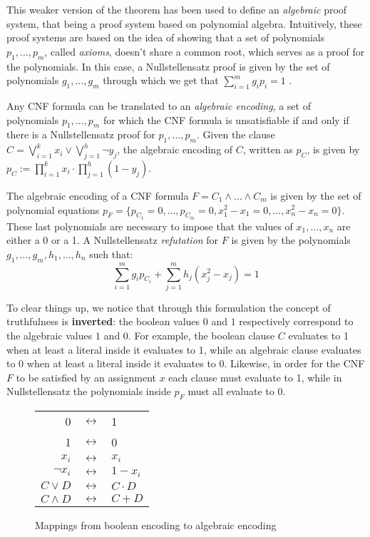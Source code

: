 This weaker version of the theorem has been used to define an \textit{algebraic} proof system, that being a proof system based on polynomial algebra. Intuitively, these proof systems are based on the idea of showing that a set of polynomials $p_1, \ldots, p_m$, called \textit{axioms}, doesn't share a common root, which serves as a proof for the polynomials. In this case, a Nullstellensatz proof is given by the set of polynomials $g_1, \ldots, g_m$ through which we get that $\sum_{i=1}^m g_ip_i = 1$  \cite{ns_definitions}. 

Any CNF formula can be translated to an \textit{algebraic encoding}, a set of polynomials $p_1, \ldots, p_m$ for which the CNF formula is unsatisfiable if and only if there is a Nullstellensatz proof for $p_1, \ldots, p_m$. Given the clause $C = \bigvee_{i = 1}^k x_i \lor \bigvee_{j = 1}^h \lnot y_j$, the algebraic encoding of $C$, written as $p_C$, is given by $p_C := \prod_{i = 1}^{k} x_i \cdot \prod_{j = 1}^h (1- y_j)$.

The algebraic encoding of a CNF formula $F = C_1 \land \ldots \land C_m$ is given by the set of polynomial equations $p_F = \{p_{C_1} = 0, \ldots, p_{C_m} = 0, x_1^2-x_1 = 0, \ldots, x_n^2-x_n = 0\}$. These last polynomials are necessary to impose that the values of $x_1, \ldots, x_n$ are either a 0 or a 1. A Nullstellensatz \textit{refutation} for $F$ is given by the polynomials $g_1, \ldots, g_m, h_1, \ldots, h_n$ such that:
\[\sum_{i = 1}^m g_ip_{C_i} + \sum_{j = 1}^m h_j(x_j^2-x_j) = 1\]

To clear things up, we notice that through this formulation the concept of truthfulness is \textbf{inverted}: the boolean values $0$ and $1$ respectively correspond to the algebraic values $1$ and $0$. For example, the boolean clause $C$ evaluates to 1 when at least a literal inside it evaluates to 1, while an algebraic clause evaluates to 0 when at least a literal inside it evaluates to 0. Likewise, in order for the CNF $F$ to be satisfied by an assignment $x$ each clause must evaluate to 1, while in Nullstellensatz the polynomials inside $p_F$ must all evaluate to 0. 

\begin{figure}[H]
    \centering
    \begin{tabular}{r c l}
 0 & $\longleftrightarrow$ & 1 \\
 1 & $\longleftrightarrow$ & 0 \\
        $x_i$ & $\longleftrightarrow$ & $x_i$ \\
        $\lnot x_i$ & $\longleftrightarrow$ & $1-x_i$ \\
        $C \lor D$ & $\longleftrightarrow$ & $C \cdot D$ \\
        $C \land D$ & $\longleftrightarrow$ & $C + D$ \\
    \end{tabular}

    \caption{Mappings from boolean encoding to algebraic encoding}
\end{figure}

